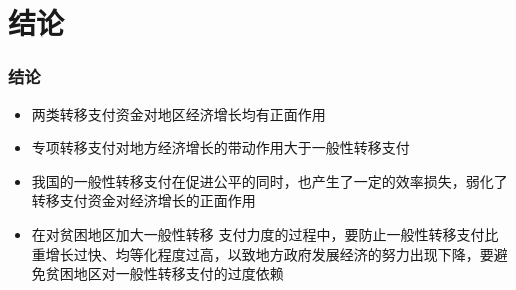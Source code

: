\section{结论} 
\begin{frame}[t]
\frametitle{结论}
\begin{center}
	\begin{itemize}
		\item 两类转移支付资金对地区经济增长均有正面作用
		\item 专项转移支付对地方经济增长的带动作用大于一般性转移支付
		\item 我国的一般性转移支付在促进公平的同时，也产生了一定的效率损失，弱化了转移支付资金对经济增长的正面作用
		\item 在对贫困地区加大一般性转移	支付力度的过程中，要防止一般性转移支付比重增长过快、均等化程度过高，以致地方政府发展经济的努力出现下降，要避免贫困地区对一般性转移支付的过度依赖
	\end{itemize}
\end{center}

\end{frame}

